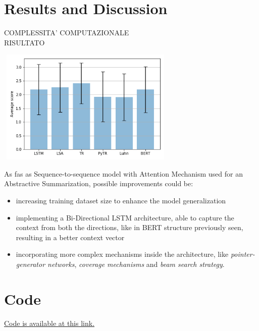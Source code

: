 \documentclass[fleqn,10pt]{SelfArx} %
\begin{document}
\section{Results and Discussion}
COMPLESSITA' COMPUTAZIONALE\\
RISULTATO\\
\par
{\centering\vspace{10pt}
\includegraphics[width=8.5cm, height=5.5cm]{results.png}
\vspace{10pt}
\par}
As fas as Sequence-to-sequence model with Attention Mechanism used for an Abstractive Summarization, possible improvements could be:
\begin{itemize}
    \item increasing training dataset size to enhance the model generalization
    \item implementing a Bi-Directional LSTM architecture, able to capture the context from both the directions, like in BERT structure previously seen, resulting in a better context vector
    \item incorporating more complex mechanisms inside the architecture, like \textit{pointer-generator networks}, \textit{coverage mechanisms} and \textit{beam search strategy}.
\end{itemize}
\section*{Code}
\href{https://github.com/RCrvro/Text-Summarization-Project}{Code is available at this link.}
\end{document}
